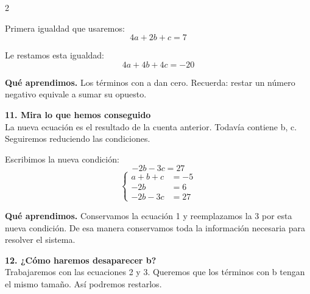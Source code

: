 \documentclass[11pt,a4paper,landscape]{article}
\begin{document}
\begin{multicols*}{2}
\begin{minipage}{\linewidth}
\par{}\par\smallskip
\par\smallskip Primera igualdad que usaremos:
\[4a + 2b + c = 7\]
\par\smallskip Le restamos esta igualdad:
\[4a + 4b + 4c = -20\]
\par\smallskip\textbf{Qué aprendimos.} Los términos con a dan cero. Recuerda: restar un número negativo equivale a sumar su opuesto.
\end{minipage}\par\medskip
\noindent\begin{minipage}{\linewidth}\textbf{11. Mira lo que hemos conseguido}\\[2pt]La nueva ecuación es el resultado de la cuenta anterior. Todavía contiene b, c. Seguiremos reduciendo las condiciones.
\par\smallskip Escribimos la nueva condición:
\[-2b - 3c = 27\]
\[\left\{\begin{aligned}a + b + c &= -5\\-2b &= 6\\-2b - 3c &= 27\end{aligned}\right.\]
\par\smallskip\textbf{Qué aprendimos.} Conservamos la ecuación 1 y reemplazamos la 3 por esta nueva condición. De esa manera conservamos toda la información necesaria para resolver el sistema.
\end{minipage}\par\medskip
\noindent\begin{minipage}{\linewidth}\textbf{12. ¿Cómo haremos desaparecer b?}\\[2pt]Trabajaremos con las ecuaciones 2 y 3. Queremos que los términos con b tengan el mismo tamaño. Así podremos restarlos.

\end{minipage}
\end{multicols*}
\end{document}

